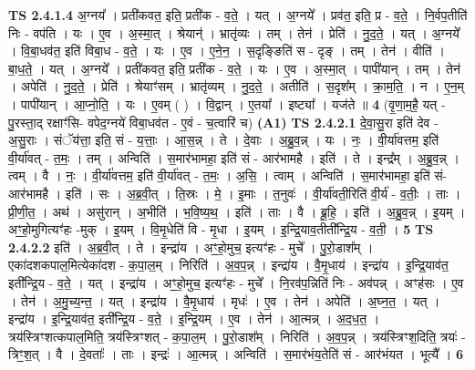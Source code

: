 \documentclass[17pt]{extarticle}
\begin{document}
                  \newline
                                \textbf{ TS 2.4.1.4} \newline
                  अ॒ग्नय᳚ । प्रती॑कवत॒ इति॒ प्रती॑क - व॒ते॒ । यत् । अ॒ग्नये᳚ । प्रव॑त॒ इति॒ प्र - व॒ते॒ । नि॒र्वप॒तीति॑ निः - वप॑ति । यः । ए॒व । अ॒स्मा॒त् । श्रेयान्॑ । भ्रातृ॑व्यः । तम् । तेन॑ । प्रेति॑ । नु॒द॒ते॒ । यत् । अ॒ग्नये᳚ । वि॒बा॒धव॑त॒ इति॑ विबा॒ध - व॒ते॒ । यः । ए॒व । ए॒ने॒न॒ । स॒दृङ्ङिति॑ स - दृङ् । तम् । तेन॑ । वीति॑ । बा॒ध॒ते॒ । यत् । अ॒ग्नये᳚ । प्रती॑कवत॒ इति॒ प्रती॑क - व॒ते॒ । यः । ए॒व । अ॒स्मा॒त् । पापी॑यान् । तम् । तेन॑ । अपेति॑ । नु॒द॒ते॒ । प्रेति॑ । श्रेयाꣳ॑सम् । भ्रातृ॑व्यम् । नु॒द॒ते॒ । अतीति॑ । स॒दृश᳚म् । क्रा॒म॒ति॒ । न । ए॒न॒म् । पापी॑यान् । आ॒प्नो॒ति॒ । यः । ए॒वम् ( ) । वि॒द्वान् । ए॒तया᳚ । इष्ट्या᳚ । यज॑ते ॥ \textbf{  4 } \newline
                  \newline
                      (वृ॒णा॒म॒है॒ यत् - पु॒रस्ता॒द् रक्षाꣳ॑सि- वपेद॒ग्नये॑ विबा॒धव॑त - ए॒वं - च॒त्वारि॑ च)  \textbf{(A1)} \newline \newline
                                \textbf{ TS 2.4.2.1} \newline
                  दे॒वा॒सु॒रा इति॑ देव - अ॒सु॒राः । संॅय॑त्ता॒ इति॒ सं - य॒त्ताः॒ । आ॒स॒न्न् । ते । दे॒वाः । अ॒ब्रु॒व॒न्न् । यः । नः॒ । वी॒र्या॑वत्तम॒ इति॑ वी॒र्या॑वत् - त॒मः॒ । तम् । अन्विति॑ । स॒मार॑भामहा॒ इति॑ सं - आर॑भामहै । इति॑ । ते । इन्द्र᳚म् । अ॒ब्रु॒व॒न्न् । त्वम् । वै । नः॒ । वी॒र्या॑वत्तम॒ इति॑ वी॒र्या॑वत् - त॒मः॒ । अ॒सि॒ । त्वाम् । अन्विति॑ । स॒मार॑भामहा॒ इति॑ सं-आर॑भामहै । इति॑ । सः । अ॒ब्र॒वी॒त् । ति॒स्रः । मे॒ । इ॒माः । त॒नुवः॑ । वी॒र्या॑वती॒रिति॑ वी॒र्य॑ - व॒तीः॒ । ताः । प्री॒णी॒त॒ । अथ॑ । असु॑रान् । अ॒भीति॑ । भ॒वि॒ष्य॒थ॒ । इति॑ । ताः । वै । ब्रू॒हि॒ । इति॑ । अ॒ब्रु॒व॒न्न् । इ॒यम् । अꣳ॒॒हो॒मुगित्यꣳ॑हः -मुक् । इ॒यम् । वि॒मृ॒धेति॑ वि - मृ॒धा । इ॒यम् । इ॒न्द्रि॒याव॒तीती᳚न्द्रि॒य - व॒ती॒ । \textbf{  5} \newline
                  \newline
                                \textbf{ TS 2.4.2.2} \newline
                  इति॑ । अ॒ब्र॒वी॒त् । ते । इन्द्रा॑य । अꣳ॒॒हो॒मुच॒ इत्यꣳ॑हः - मुचे᳚ । पु॒रो॒डाश᳚म् । एका॑दशकपाल॒मित्येका॑दश - क॒पा॒ल॒म् । निरिति॑ । अ॒व॒प॒न्न् । इन्द्रा॑य । वै॒मृ॒धाय॑ । इन्द्रा॑य । इ॒न्द्रि॒याव॑त॒ इती᳚न्द्रि॒य - व॒ते॒ । यत् । इन्द्रा॑य । अꣳ॒॒हो॒मुच॒ इत्यꣳ॑हः - मुचे᳚ । नि॒रव॑प॒न्निति॑ निः - अव॑पन्न् । अꣳह॑सः । ए॒व । तेन॑ । अ॒मु॒च्य॒न्त॒ । यत् । इन्द्रा॑य । वै॒मृ॒धाय॑ । मृधः॑ । ए॒व । तेन॑ । अपेति॑ । अ॒घ्न॒त॒ । यत् । इन्द्रा॑य । इ॒न्द्रि॒याव॑त॒ इती᳚न्द्रि॒य - व॒ते॒ । इ॒न्द्रि॒यम् । ए॒व । तेन॑ । आ॒त्मन्न् । अ॒द॒ध॒त॒ । त्रय॑स्त्रिꣳशत्कपाल॒मिति॒ त्रय॑स्त्रिꣳशत् - क॒पा॒ल॒म् । पु॒रो॒डाश᳚म् । निरिति॑ । अ॒व॒प॒न्न् । त्रय॑स्त्रिꣳश॒दिति॒ त्रयः॑ - त्रिꣳ॒॒श॒त् । वै । दे॒वताः᳚ । ताः । इन्द्रः॑ । आ॒त्मन्न् । अन्विति॑ । स॒मार॑भंय॒तेति॑ सं - आर॑भंयत । भूत्यै᳚ । \textbf{  6} \newline
\end{document}

